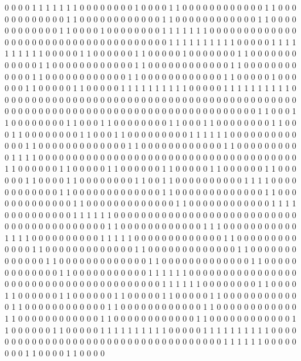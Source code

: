 0 0 0 0 1 1 1 1 1 1 1 0 0 0 0
0 0 0 0 1 0 0 0 0 1 1 0 0 0 0
0 0 0 0 0 0 0 0 1 1 0 0 0 0 0
0 0 0 0 0 0 0 1 1 0 0 0 0 0 0
0 0 0 0 0 0 1 1 0 0 0 0 0 0 0
0 0 0 0 0 1 1 0 0 0 0 0 0 0 0
0 0 0 0 1 1 0 0 0 0 1 0 0 0 0
0 0 0 0 1 1 1 1 1 1 1 0 0 0 0
0 0 0 0 0 0 0 0 0 0 0 0 0 0 0
0 0 0 0 0 0 0 0 0 0 0 0 0 0 0
0 0 0 1 1 1 1 1 1 1 1 1 1 0 0
0 0 0 1 1 1 1 1 1 1 1 1 1 0 0
0 0 0 1 1 0 0 0 0 0 0 1 1 0 0
0 0 0 1 0 0 0 0 0 0 0 1 1 0 0
0 0 0 0 0 0 0 0 0 0 1 1 0 0 0
0 0 0 0 0 0 0 0 0 1 1 0 0 0 0
0 0 0 0 0 0 0 0 1 1 0 0 0 0 0
0 0 0 0 0 0 0 1 1 0 0 0 0 0 0
0 0 0 0 0 0 1 1 0 0 0 0 0 0 0
0 0 0 0 0 1 1 0 0 0 0 0 1 0 0
0 0 0 0 1 1 0 0 0 0 0 1 1 0 0
0 0 0 1 1 1 1 1 1 1 1 1 1 0 0
0 0 0 1 1 1 1 1 1 1 1 1 1 0 0
0 0 0 0 0 0 0 0 0 0 0 0 0 0 0
0 0 0 0 0 0 0 0 0 0 0 0 0 0 0
0 0 0 0 0 0 0 0 0 0 0 0 0 0 0
0 0 0 0 0 0 0 0 0 0 0 0 0 0 0
0 0 0 0 0 0 0 0 0 0 0 0 0 0 0
0 0 0 0 1 1 0 0 0 1 1 0 0 0 0
0 0 0 0 1 1 0 0 0 1 1 0 0 0 0
0 0 0 0 1 1 0 0 0 1 1 0 0 0 0
0 0 0 0 1 1 0 0 0 1 1 0 0 0 0
0 0 0 0 1 1 0 0 0 1 1 0 0 0 0
0 0 0 0 0 1 1 1 1 1 1 0 0 0 0
0 0 0 0 0 0 0 0 0 1 1 0 0 0 0
0 0 0 0 0 0 0 0 0 1 1 0 0 0 0
0 0 0 0 0 0 0 0 1 1 0 0 0 0 0
0 0 0 0 0 1 1 1 1 0 0 0 0 0 0
0 0 0 0 0 0 0 0 0 0 0 0 0 0 0
0 0 0 0 0 0 0 0 0 0 0 0 0 0 0
0 0 1 1 0 0 0 0 0 0 1 1 0 0 0
0 0 1 1 0 0 0 0 0 0 1 1 0 0 0
0 0 1 1 0 0 0 0 0 0 1 1 0 0 0
0 0 0 1 1 0 0 0 0 1 1 0 0 0 0
0 0 0 0 1 1 0 0 1 1 0 0 0 0 0
0 0 0 0 0 1 1 1 1 0 0 0 0 0 0
0 0 0 0 0 0 1 1 0 0 0 0 0 0 0
0 0 0 0 0 0 1 1 0 0 0 0 0 0 0
0 0 0 0 0 0 1 1 0 0 0 0 0 0 0
0 0 0 0 0 0 1 1 0 0 0 0 0 0 0
0 0 0 0 0 0 1 1 0 0 0 0 0 0 0
0 0 0 0 0 1 1 1 1 0 0 0 0 0 0
0 0 0 0 1 1 1 1 1 1 0 0 0 0 0
0 0 0 0 0 0 0 0 0 0 0 0 0 0 0
0 0 0 0 0 0 0 0 0 0 0 0 0 0 0
0 0 0 0 0 0 0 1 1 0 0 0 0 0 0
0 0 0 0 0 0 1 1 1 0 0 0 0 0 0
0 0 0 0 0 1 1 1 1 0 0 0 0 0 0
0 0 0 0 1 1 1 1 1 0 0 0 0 0 0
0 0 0 0 0 0 0 1 1 0 0 0 0 0 0
0 0 0 0 0 0 0 1 1 0 0 0 0 0 0
0 0 0 0 0 0 0 1 1 0 0 0 0 0 0
0 0 0 0 0 0 0 1 1 0 0 0 0 0 0
0 0 0 0 0 0 0 1 1 0 0 0 0 0 0
0 0 0 0 0 0 0 1 1 0 0 0 0 0 0
0 0 0 0 0 0 0 1 1 0 0 0 0 0 0
0 0 0 0 0 0 0 1 1 0 0 0 0 0 0
0 0 0 0 0 1 1 1 1 1 1 0 0 0 0
0 0 0 0 0 0 0 0 0 0 0 0 0 0 0
0 0 0 0 0 0 0 0 0 0 0 0 0 0 0
0 0 0 0 0 1 1 1 1 1 1 0 0 0 0
0 0 0 0 1 1 0 0 0 0 1 1 0 0 0
0 0 0 1 1 0 0 0 0 0 0 1 1 0 0
0 0 0 1 1 0 0 0 0 0 1 1 0 0 0
0 0 0 0 0 0 0 0 0 1 1 0 0 0 0
0 0 0 0 0 0 0 0 1 1 0 0 0 0 0
0 0 0 0 0 0 0 1 1 0 0 0 0 0 0
0 0 0 0 0 0 1 1 0 0 0 0 0 0 0
0 0 0 0 0 1 1 0 0 0 0 0 0 0 0
0 0 0 0 1 1 0 0 0 0 0 0 0 0 0
0 0 0 1 1 0 0 0 0 0 0 1 1 0 0
0 0 0 1 1 1 1 1 1 1 1 1 1 0 0
0 0 0 1 1 1 1 1 1 1 1 1 1 0 0
0 0 0 0 0 0 0 0 0 0 0 0 0 0 0
0 0 0 0 0 0 0 0 0 0 0 0 0 0 0
0 0 0 0 1 1 1 1 1 1 0 0 0 0 0
0 0 0 1 1 0 0 0 0 1 1 0 0 0 0
